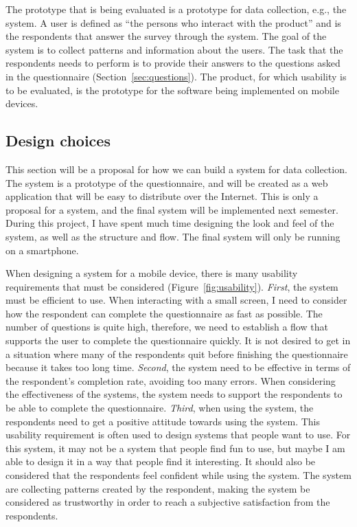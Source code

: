   The prototype that is being evaluated is a prototype for data collection, e.g., the system. A user is defined as ``the persons who interact with the product'' and is the respondents that answer the survey through the system. The goal of the system is to collect patterns and information about the users. The task that the respondents needs to perform is to provide their answers to the questions asked in the questionnaire (Section~\ref{sec:questions}). The product, for which usability is to be evaluated, is the prototype for the software being implemented on mobile devices.  

  \subsection{Design choices} \label{sec:designChoices}
    
  This section will be a proposal for how we can build a system for data collection. The system is a prototype of the questionnaire, and will be created as a web application that will be easy to distribute over the Internet. This is only a proposal for a system, and the final system will be implemented next semester. During this project, I have spent much time designing the look and feel of the system, as well as the structure and flow. The final system will only be running on a smartphone.

  When designing a system for a mobile device, there is many usability requirements that must be considered (Figure~\ref{fig:usability}). {\it First}, the system must be efficient to use. When interacting with a small screen, I need to consider how the respondent can complete the questionnaire as fast as possible. The number of questions is quite high, therefore, we need to establish a flow that supports the user to complete the questionnaire quickly. It is not desired to get in a situation where many of the respondents quit before finishing the questionnaire because it takes too long time. {\it Second}, the system need to be effective in terms of the respondent's completion rate, avoiding too many errors. When considering the effectiveness of the systems, the system needs to support the respondents to be able to complete the questionnaire. {\it Third}, when using the system, the respondents need to get a positive attitude towards using the system. This usability requirement is often used to design systems that people want to use. For this system, it may not be a system that people find fun to use, but maybe I am able to design it in a way that people find it interesting. It should also be considered that the respondents feel confident while using the system. The system are collecting patterns created by the respondent, making the system be considered as trustworthy in order to reach a subjective satisfaction from the respondents.

